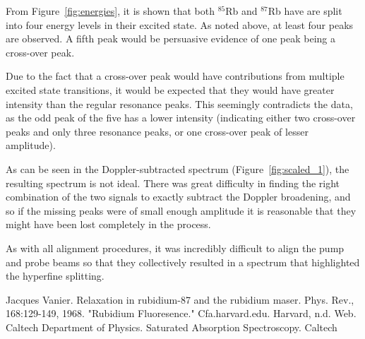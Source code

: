 \documentclass[paper=a4, fontsize=11pt]{scrartcl} %
\numberwithin{equation}{section}
\numberwithin{figure}{section}
\numberwithin{table}{section}
\begin{document}
From Figure~\ref{fig:energies}, it is shown that both $^{85}$Rb and $^{87}$Rb have are split into four energy levels in their excited state. As noted above, at least four peaks are observed. A fifth peak would be persuasive evidence of one peak being a cross-over peak.

Due to the fact that a cross-over peak would have contributions from multiple excited state transitions, it would be expected that they would have greater intensity than the regular resonance peaks. This seemingly contradicts the data, as the odd peak of the five has a lower intensity (indicating either two cross-over peaks and only three resonance peaks, or one cross-over peak of lesser amplitude).

As can be seen in the Doppler-subtracted spectrum
(Figure~\ref{fig:scaled_1}), the resulting spectrum is not ideal. There was great difficulty in finding the right combination of the two
signals to exactly subtract the Doppler broadening, and so if the
missing peaks were of small enough amplitude it is reasonable that
they might have been lost completely in the process.

As with all alignment procedures, it was incredibly difficult to align the pump and probe beams so that they collectively resulted in a spectrum that highlighted the hyperfine splitting.


\begin{thebibliography}{99}
Jacques Vanier. Relaxation in rubidium-87 and the
  rubidium maser. Phys. Rev., 168:129-149, 1968.
"Rubidium Fluoresence." Cfa.harvard.edu. Harvard,
  n.d. Web.
Caltech Department of Physics. Saturated Absorption
Spectroscopy. Caltech
\end{thebibliography}


\end{document}
